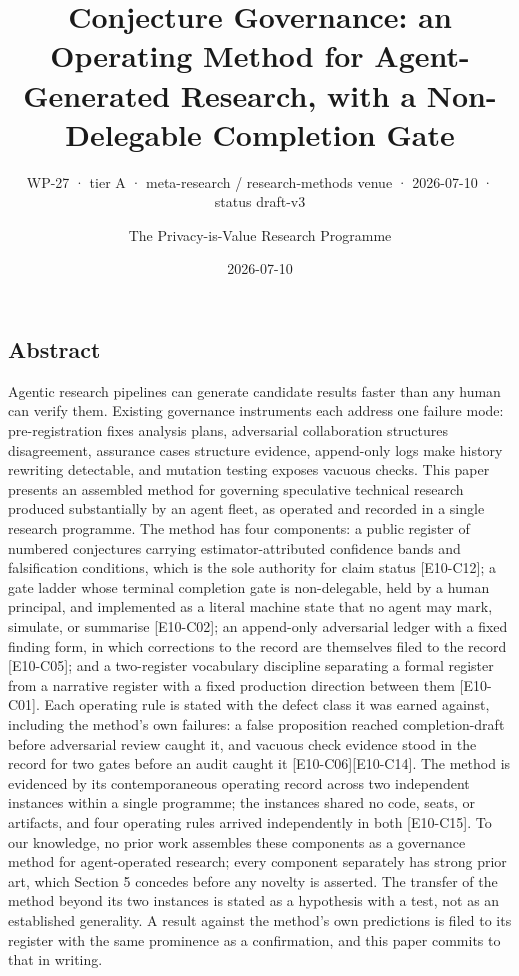 \documentclass[
  11pt,
]{article}
\title{Conjecture Governance: an Operating Method for Agent-Generated
Research, with a Non-Delegable Completion Gate}
\subtitle{WP-27 · tier A · meta-research / research-methods venue ·
2026-07-10 · status draft-v3}
\author{The Privacy-is-Value Research Programme}
\date{2026-07-10}
\begin{document}
\maketitle

\subsection{Abstract}\label{abstract}

Agentic research pipelines can generate candidate results faster than
any human can verify them. Existing governance instruments each address
one failure mode: pre-registration fixes analysis plans, adversarial
collaboration structures disagreement, assurance cases structure
evidence, append-only logs make history rewriting detectable, and
mutation testing exposes vacuous checks. This paper presents an
assembled method for governing speculative technical research produced
substantially by an agent fleet, as operated and recorded in a single
research programme. The method has four components: a public register of
numbered conjectures carrying estimator-attributed confidence bands and
falsification conditions, which is the sole authority for claim status
{[}E10-C12{]}; a gate ladder whose terminal completion gate is
non-delegable, held by a human principal, and implemented as a literal
machine state that no agent may mark, simulate, or summarise
{[}E10-C02{]}; an append-only adversarial ledger with a fixed finding
form, in which corrections to the record are themselves filed to the
record {[}E10-C05{]}; and a two-register vocabulary discipline
separating a formal register from a narrative register with a fixed
production direction between them {[}E10-C01{]}. Each operating rule is
stated with the defect class it was earned against, including the
method's own failures: a false proposition reached completion-draft
before adversarial review caught it, and vacuous check evidence stood in
the record for two gates before an audit caught it
{[}E10-C06{]}{[}E10-C14{]}. The method is evidenced by its
contemporaneous operating record across two independent instances within
a single programme; the instances shared no code, seats, or artifacts,
and four operating rules arrived independently in both {[}E10-C15{]}. To
our knowledge, no prior work assembles these components as a governance
method for agent-operated research; every component separately has
strong prior art, which Section 5 concedes before any novelty is
asserted. The transfer of the method beyond its two instances is stated
as a hypothesis with a test, not as an established generality. A result
against the method's own predictions is filed to its register with the
same prominence as a confirmation, and this paper commits to that in
writing.
\end{document}
